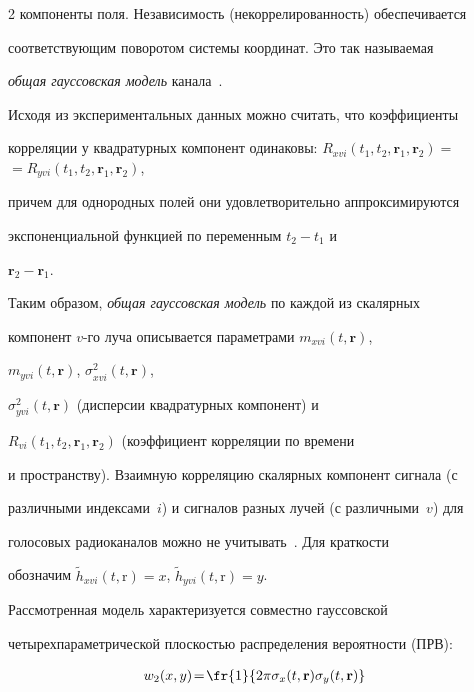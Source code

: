 \begin{multicols}{2}
компоненты поля. Независимость (некоррелированность) обеспечивается 


соответствующим поворотом системы координат. Это так называемая 


\textit{общая гауссовская модель} канала~\cite{5-pr, 7-pr}.


     


     Исходя из экспериментальных данных можно считать, что коэффициенты 


корреляции у квадратурных компонент одинаковы: $R_{xvi}(t_1, t_2, 


\mathbf{r}_1, \mathbf{r}_2)=$\linebreak $= R_{yvi}(t_1, t_2, \mathbf{r}_1, \mathbf{r}_2)$, 


причем для однородных полей они удовлетворительно аппроксимируются 


экспоненциальной функцией по переменным $t_2-t_1$ и 


     $\mathbf{r}_2-\mathbf{r}_1$.


     


     Таким образом, \textit{общая гауссовская модель} по каж\-дой из скалярных 


компонент $v$-го луча описывается параметрами $m_{xvi}(t,\mathbf{r})$, 


$m_{yvi}(t,\mathbf{r})$, $\sigma^2_{xvi}(t,\mathbf{r})$, 


$\sigma^2_{yvi}(t,\mathbf{r})$ (дисперсии квадратурных компонент) и 


$R_{vi}(t_1,t_2,\mathbf{r}_1, \mathbf{r}_2)$ (коэффициент корреляции по времени 


и пространству). Взаимную корреляцию скалярных компонент сигнала (с 


различными индексами~$i$) и сигналов разных лучей (с различными~$v$) для 


голосовых радиоканалов можно не учитывать~\cite{6-pr, 5-pr}. Для краткости 


обозначим $\tilde{h}_{xvi}(t,\mathrm{r})=x$, $\tilde{h}_{yvi}(t,\mathrm{r})=y$. 


Рассмотренная модель характеризуется совместно гауссовской 


четырехпараметрической плоскостью распределения вероятности (ПРВ):


     \begin{multline*}


\hspace*{-7.5pt}w_2(x,y)\!=\!\fr{1}{2\pi \sigma_x(t,\mathbf{r})\sigma_y(t,\mathbf{r})}



\end{multline*}
\end{multicols}
